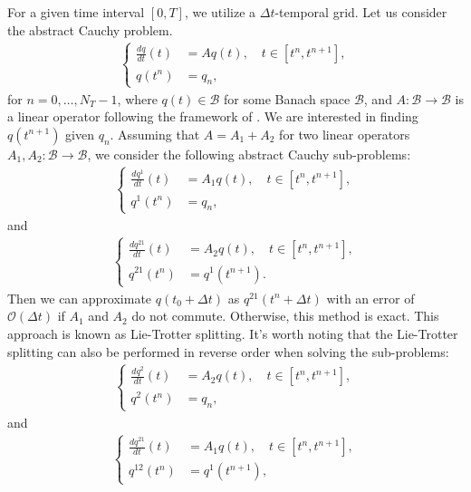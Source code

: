 For a given time interval $[0,T]$, we utilize a $\Delta t$-temporal grid. Let us consider the abstract Cauchy problem.
\begin{align*}
	\begin{cases}
		\frac{dq}{dt}(t) &= Aq(t), \quad t \in [t^n,t^{n+1}],\\
		q(t^n) &= q_n,
	\end{cases}
\end{align*}
for $n=0,\ldots, N_T-1$, where $q(t) \in \mathcal{B}$ for some Banach space $\mathcal{B}$, and $A:\mathcal{B} \to \mathcal{B}$ is a linear operator
following the framework of \citet[Chapter~3]{richtmyer:1968}.
We are interested in finding $q(t^{n+1})$ given $q_n$.
Assuming that $A = A_1 + A_2$ for two linear operators $A_1, A_2:\mathcal{B} \to \mathcal{B}$, we consider the following abstract Cauchy sub-problems:
\begin{align*}
	\begin{cases}
		\frac{dq^1}{dt}(t) &= A_1q(t), \quad t \in [t^{n},t^{n+1}],\\
		q^{1}(t^n) &= q_n,
	\end{cases}
\end{align*}
and
\begin{align*}
	\begin{cases}
		\frac{dq^{21}}{dt}(t) &= A_2q(t), \quad t \in [t^n,t^{n+1}],\\
		q^{21}(t^n) &= q^1(t^{n+1}).
	\end{cases}
\end{align*}
Then we can approximate $q(t_0 + \Delta t)$ as $q^{21}(t^n + \Delta t)$ 
with an error of $\mathcal{O}(\Delta t)$ if $A_1$ and $A_2$ do not commute. 
Otherwise, this method is exact.
This approach is known as Lie-Trotter splitting. 
It's worth noting that the Lie-Trotter splitting can also be performed in reverse order when solving the sub-problems:
\begin{align*}
	\begin{cases}
		\frac{dq^2}{dt}(t) &= A_2q(t), \quad t \in [t^n,t^{n+1}],\\
		q^{2}(t^n) &= q_n,
	\end{cases}
\end{align*}
and 
\begin{align*}
	\begin{cases}
		\frac{dq^{21}}{dt}(t) &= A_1q(t), \quad t \in [t^n,t^{n+1}],\\
		q^{12}(t^n) &= q^1(t^{n+1}),
	\end{cases}
\end{align*}
